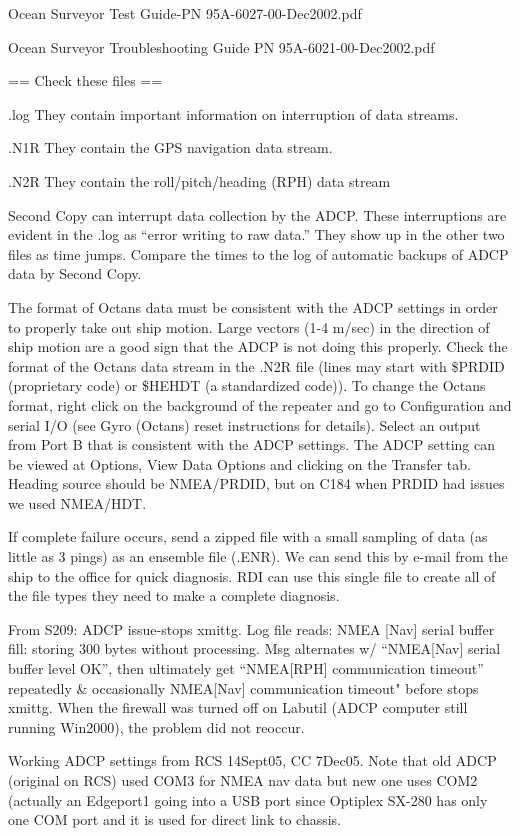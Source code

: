 \documentclass[]{book}
\theoremstyle{definition}
\theoremstyle{definition}
\theoremstyle{definition}
\theoremstyle{remark}
\begin{document}
Ocean Surveyor Test Guide-PN 95A-6027-00-Dec2002.pdf

Ocean Surveyor Troubleshooting Guide PN 95A-6021-00-Dec2002.pdf

== Check these files ==

.log They contain important information on interruption of data streams.

.N1R They contain the GPS navigation data stream.

.N2R They contain the roll/pitch/heading (RPH) data stream

Second Copy can interrupt data collection by the ADCP. These
interruptions are evident in the .log as ``error writing to raw data.''
They show up in the other two files as time jumps. Compare the times to
the log of automatic backups of ADCP data by Second Copy.

The format of Octans data must be consistent with the ADCP settings in
order to properly take out ship motion. Large vectors (1-4 m/sec) in the
direction of ship motion are a good sign that the ADCP is not doing this
properly. Check the format of the Octans data stream in the .N2R file
(lines may start with \$PRDID (proprietary code) or \$HEHDT (a
standardized code)). To change the Octans format, right click on the
background of the repeater and go to Configuration and serial I/O (see
Gyro (Octans) reset instructions for details). Select an output from
Port B that is consistent with the ADCP settings. The ADCP setting can
be viewed at Options, View Data Options and clicking on the Transfer
tab. Heading source should be NMEA/PRDID, but on C184 when PRDID had
issues we used NMEA/HDT.

If complete failure occurs, send a zipped file with a small sampling of
data (as little as 3 pings) as an ensemble file (.ENR). We can send this
by e-mail from the ship to the office for quick diagnosis. RDI can use
this single file to create all of the file types they need to make a
complete diagnosis.

From S209: ADCP issue-stops xmittg. Log file reads: NMEA {[}Nav{]}
serial buffer fill: storing 300 bytes without processing. Msg alternates
w/ ``NMEA{[}Nav{]} serial buffer level OK'', then ultimately get
``NMEA{[}RPH{]} communication timeout'' repeatedly \& occasionally
NMEA{[}Nav{]} communication timeout" before stops xmittg. When the
firewall was turned off on Labutil (ADCP computer still running
Win2000), the problem did not reoccur.

Working ADCP settings from RCS 14Sept05, CC 7Dec05. Note that old ADCP
(original on RCS) used COM3 for NMEA nav data but new one uses COM2
(actually an Edgeport1 going into a USB port since Optiplex SX-280 has
only one COM port and it is used for direct link to chassis.
\end{document}
